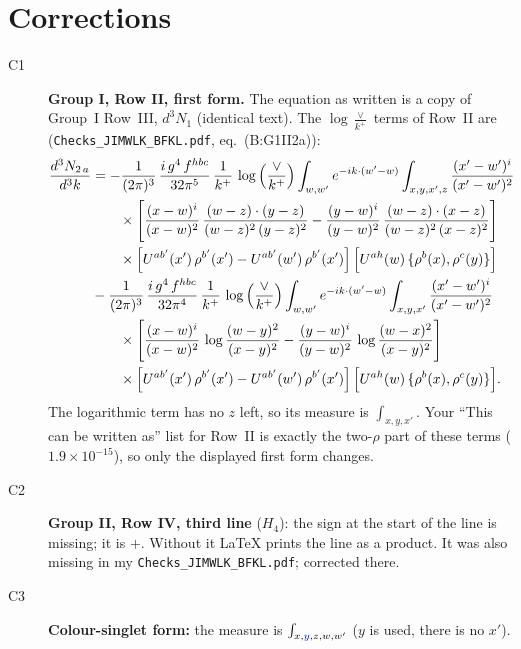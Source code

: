 \documentclass[10pt]{article}
\newcommand{\new}[1]{{\color{blue}#1}}
\newcommand{\LV}{\log\frac{\vee}{k^+}}
\begin{document}
\section{Corrections}
\begin{description}
\item[C1] \textbf{Group I, Row II, first form.} The equation as written is a copy of Group~I Row~III, $d^3N_1$ (identical text). The $\LV$ terms of Row~II are (\texttt{Checks\_JIMWLK\_BFKL.pdf}, eq.\ (B:G1II2a)):
\begin{align}
\frac{d^{3}N_{2\,a}}{d^{3}k} & = -\frac{1}{(2\pi)^{3}}\,\frac{i\,g^{4}\,f^{hbc}}{32\pi^{5}}\,\frac{1}{k^{+}}\,\log\Big(\frac{\vee}{k^{+}}\Big)\int_{w,w'} e^{-ik\cdot(w'-w)}\int_{x,y,x',z}\frac{(x'-w')^{i}}{(x'-w')^{2}}\notag\\&\qquad\times\Bigg[\frac{(x-w)^{i}}{(x-w)^{2}}\, \frac{(w-z)\cdot (y-z)}{(w-z)^{2}\,(y-z)^{2}}- \frac{(y-w)^{i}}{(y-w)^{2}}\, \frac{(w-z)\cdot (x-z)}{(w-z)^{2}\,(x-z)^{2}}\Bigg]\notag\\
&\qquad\times\Big[U^{ab'}(x')\,\rho^{b'}(x')-U^{ab'}(w')\,\rho^{b'}(x')\Big]\, \Big[U^{ah}(w)\,\{\rho^{b}(x),\rho^{c}(y)\}\Big]\notag \\
& -\frac{1}{(2\pi)^{3}}\,\frac{i\,g^{4}\,f^{hbc}}{32\pi^{4}}\,\frac{1}{k^{+}}\,\log\Big(\frac{\vee}{k^{+}}\Big)\int_{w,w'} e^{-ik\cdot(w'-w)}\int_{x,y,x'}\frac{(x'-w')^{i}}{(x'-w')^{2}}\notag\\&\qquad\times\Bigg[\frac{(x-w)^{i}}{(x-w)^{2}}\,\log\frac{(w-y)^{2}}{(x-y)^{2}}-\frac{(y-w)^{i}}{(y-w)^{2}}\,\log\frac{(w-x)^{2}}{(x-y)^{2}}\Bigg]\notag \\
&\qquad\times\Big[U^{ab'}(x')\,\rho^{b'}(x')-U^{ab'}(w')\,\rho^{b'}(x')\Big]\, \Big[U^{ah}(w)\,\{\rho^{b}(x),\rho^{c}(y)\}\Big].
\end{align}
The logarithmic term has no $z$ left, so its measure is $\int_{x,y,x'}$. Your ``This can be written as'' list for Row~II is exactly the two-$\rho$ part of these terms ($1.9\times10^{-15}$), so only the displayed first form changes.
\item[C2] \textbf{Group II, Row IV, third line} ($H_4$): the sign at the start of the line is missing; it is \new{$+$}. Without it LaTeX prints the line as a product. It was also missing in my \texttt{Checks\_JIMWLK\_BFKL.pdf}; corrected there.
\item[C3] \textbf{Colour-singlet form:} the measure is $\int_{x,\new{y},z,w,w'}$ ($y$ is used, there is no $x'$).
\end{description}
\end{document}
